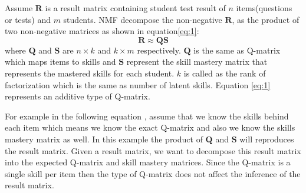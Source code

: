 Assume $\mathbf{R}$ is a result matrix containing student test result of ${n}$ items(questions or tests) and ${m}$ students. \ac{NMF} decompose the non-negative $\mathbf{R}$, as the product of two non-negative matrices as shown in equation\protect\eqref{eq:1}:
\begin{equation}
\mathbf{R}\approx\mathbf{Q}\mathbf{S}\label{eq:1}
\end{equation}
where $\mathbf{Q}$ and $\mathbf{S}$ are ${n}\times{k}$ and ${k}\times{m}$ respectively. $\mathbf{Q}$ is the same as Q-matrix which maps items to skills and $\mathbf{S}$ represent the skill mastery matrix that represents the mastered skills for each student. ${k}$ is called as the rank of factorization which is the same as number of latent skills. Equation \ref{eq:1} represents an additive type of Q-matrix.

For example in the following equation , assume that we know the skills behind each item which means we know the exact Q-matrix and also we know the skills mastery matrix as well. In this example the product of $\mathbf{Q}$ and $\mathbf{S}$ will reproduces the result matrix. Given a result matrix, we want to decompose this result matrix into the expected Q-matrix and skill mastery matrices. Since the Q-matrix is a single skill per item then the type of Q-matrix does not affect the inference of the result matrix.

